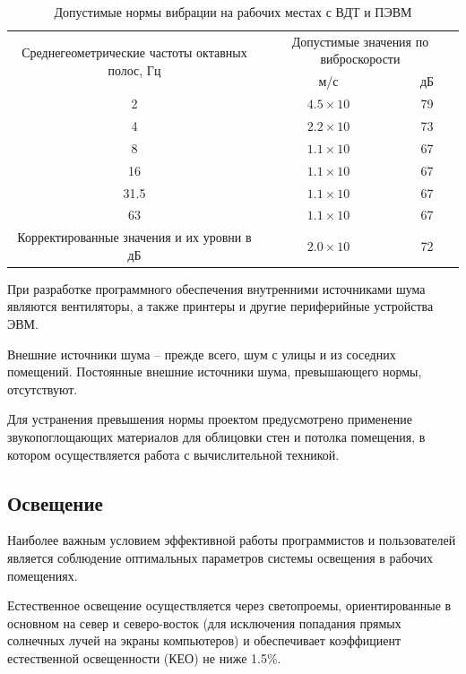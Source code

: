 \begin{table}[ht]
  \center
  \caption{Допустимые нормы вибрации на рабочих местах с ВДТ и ПЭВМ}
  \begin{tabular}{|c|c|c|}
  \hline
  \multicolumn{1}{|c|}{\multirow{2}{0.4\textwidth}{\centering Среднегеометрические частоты октавных полос, Гц}}
  & \multicolumn{2}{|p{0.4\textwidth}|}{\centering Допустимые значения по виброскорости} \\
  \cline{2-3} & \multicolumn{1}{|p{0.2\textwidth}|}{\centering м/с} & \multicolumn{1}{|p{0.2\textwidth}|}{\centering дБ} \\  
  \hline
  2 & $4.5 \times 10$ & 79 \\
  \hline
  4 & $2.2 \times 10$ & 73 \\
  \hline
  8 & $1.1 \times 10$ & 67 \\
  \hline
  16 & $1.1 \times 10$ & 67 \\
  \hline
  31.5 & $1.1 \times 10$ & 67 \\
  \hline
  63 & $1.1 \times 10$ & 67 \\
  \hline
  \multicolumn{1}{|p{0.4\textwidth}|}{\centering Корректированные значения и их уровни в дБ} & \multirow{2}{*}{$2.0 \times 10$} & \multirow{2}{*}{72} \\
  \hline
  \end{tabular}
  \label{tab:noizeLevel}
\end{table}

При разработке программного обеспечения внутренними источниками шума являются вентиляторы, а также принтеры и другие периферийные устройства ЭВМ. 

Внешние источники шума – прежде всего, шум с улицы и из соседних помещений. Постоянные внешние источники шума, превышающего нормы, отсутствуют.

Для устранения превышения нормы проектом предусмотрено применение звукопоглощающих материалов для облицовки стен и потолка помещения, в котором осуществляется работа с вычислительной техникой.

\subsection{Освещение}
Наиболее важным условием эффективной работы программистов и пользователей является соблюдение оптимальных параметров системы освещения в рабочих помещениях.

Естественное освещение осуществляется через светопроемы, ориентированные в основном на север и северо-восток (для исключения попадания прямых солнечных лучей на экраны компьютеров) и обеспечивает коэффициент естественной освещенности (КЕО) не ниже 1.5\%.

